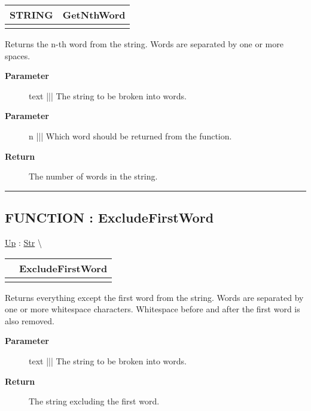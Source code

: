 {\renewcommand{\arraystretch}{1.5}
\begin{tabularx}{\textwidth}{|>{\raggedright\arraybackslash}l|X|}
\hline
\hspace{0pt}STRING & GetNthWord \\
\hline
\multicolumn{2}{|>{\raggedright\arraybackslash}X|}{\hspace{0pt}(STRING text, UNSIGNED4 n)} \\
\hline
\end{tabularx}
}

\par
Returns the n-th word from the string. Words are separated by one or more spaces.

\par
\begin{description}
\item [\textbf{Parameter}] text ||| The string to be broken into words.
\item [\textbf{Parameter}] n ||| Which word should be returned from the function.
\item [\textbf{Return}] The number of words in the string.
\end{description}

\rule{\linewidth}{0.5pt}
\subsection*{FUNCTION : ExcludeFirstWord}
\hypertarget{ecldoc:str.excludefirstword}{}
\hyperlink{ecldoc:Str}{Up} :
\hspace{0pt} \hyperlink{ecldoc:Str}{Str} \textbackslash 

{\renewcommand{\arraystretch}{1.5}
\begin{tabularx}{\textwidth}{|>{\raggedright\arraybackslash}l|X|}
\hline
\hspace{0pt} & ExcludeFirstWord \\
\hline
\multicolumn{2}{|>{\raggedright\arraybackslash}X|}{\hspace{0pt}(STRING text)} \\
\hline
\end{tabularx}
}

\par
Returns everything except the first word from the string. Words are separated by one or more whitespace characters. Whitespace before and after the first word is also removed.

\par
\begin{description}
\item [\textbf{Parameter}] text ||| The string to be broken into words.
\item [\textbf{Return}] The string excluding the first word.
\end{description}

